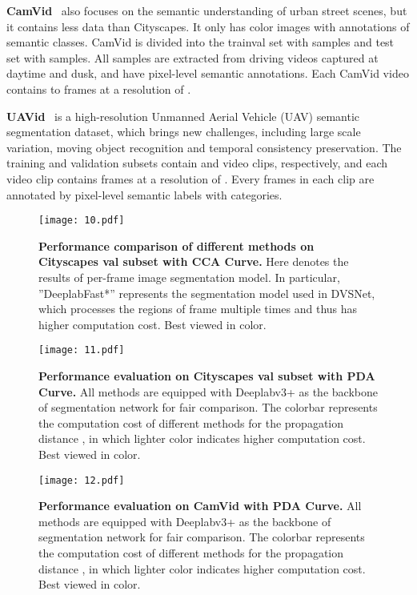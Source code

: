 \documentclass[journal]{IEEEtran}
\begin{document}
\textbf{CamVid}~\cite{brostow2009semantic} also focuses on the semantic understanding of urban street scenes, but it contains less data than Cityscapes. It only has  color images with annotations of  semantic classes. CamVid is divided into the trainval set with  samples and test set with  samples.  All samples are extracted from driving videos captured at daytime and dusk, and have pixel-level semantic annotations. Each CamVid video contains  to  frames at a resolution of .

\textbf{UAVid}~\cite{lyu2020uavid} is a high-resolution Unmanned Aerial Vehicle (UAV) semantic segmentation dataset, which brings new challenges, including large scale variation, moving object recognition and temporal consistency preservation. The training and validation subsets contain  and  video clips, respectively, and each video clip contains  frames at a resolution of . Every  frames in each clip are annotated by pixel-level semantic labels with  categories.



\begin{figure}[t]
	\begin{center}
		\texttt{[image: 10.pdf]}
	\end{center}
	\caption{\textbf{Performance comparison of different methods on Cityscapes val subset with CCA Curve.} Here  denotes the results of per-frame image segmentation model.  In particular, ''DeeplabFast*'' represents the segmentation model used in DVSNet, which processes the regions of frame multiple times and thus has higher computation cost. Best viewed in color.}
	\label{exp_cityscapes}
\end{figure}


\begin{figure}[t]
	\begin{center}
		\texttt{[image: 11.pdf]}
	\end{center}
	\caption{\textbf{Performance evaluation on Cityscapes val subset with PDA Curve.} All methods are equipped with Deeplabv3+ as the backbone of segmentation network for fair comparison. The colorbar represents the computation cost of different methods for the propagation distance , in which lighter color indicates higher computation cost. Best viewed in color.}
	\label{exp_SCM_cityscapes}
\end{figure}

\begin{figure}[t]
	\begin{center}
		\texttt{[image: 12.pdf]}
	\end{center}
	\caption{\textbf{Performance evaluation on CamVid with PDA Curve.} All methods are equipped with Deeplabv3+ as the backbone of segmentation network for fair comparison. The colorbar represents the computation cost of different methods for the propagation distance , in which lighter color indicates higher computation cost. Best viewed in color.}
	\label{exp_SCM_camvid}
\end{figure}
\end{document}
